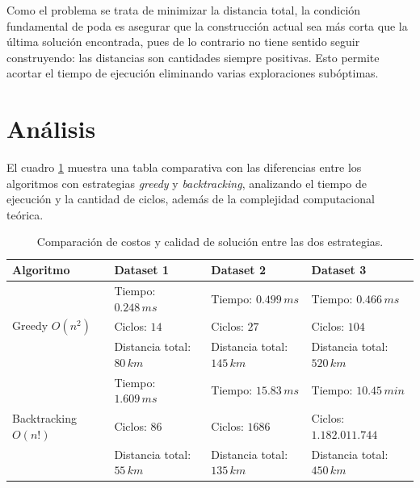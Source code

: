 \documentclass[10 pt, A4paper]{article}
\begin{document}
	Como el problema se trata de minimizar la distancia total, la condición fundamental de poda es asegurar que la construcción actual sea más corta que la última solución encontrada, pues de lo contrario no tiene sentido seguir construyendo: las distancias son cantidades siempre positivas. Esto permite acortar el tiempo de ejecución eliminando varias exploraciones subóptimas.
	
	\section*{Análisis}
	El cuadro \ref{table} muestra una tabla comparativa con las diferencias entre los algoritmos con estrategias \textit{greedy} y \textit{backtracking}, analizando el tiempo de ejecución y la cantidad de ciclos, además de la complejidad computacional teórica.
	
	\begin{table}[h!]
		\centering
		\begin{tabular}{|p{3.8cm} | p{3.5cm} | p{3.6cm} | p{3.6cm}|}
			\hline
			Algoritmo & Dataset 1 & Dataset 2 & Dataset 3 \\
			\hline
			\multirow{3}{1em}{Greedy $O(n^2)$} & Tiempo: $0.248\,ms$ & Tiempo: $0.499\,ms$& Tiempo: $0.466\,ms$ \\ & Ciclos: $14$ & Ciclos: $27$ & Ciclos: $104$ \\ & Distancia total: $80\,km$ & Distancia total: $145\,km$& Distancia total: $520\,km$ \\
			\hline
			\multirow{3}{1em}{Backtracking $O(n!)$} & Tiempo: $1.609\,ms$& Tiempo: $15.83\,ms$& Tiempo: $10.45\,min$\\ & Ciclos: $86$ & Ciclos: $1686$ & Ciclos: $1.182.011.744$ \\ & Distancia total: $55\,km$& Distancia total: $135\,km$& Distancia total: $450\,km$\\
			\hline
		\end{tabular}
		\caption{Comparación de costos y calidad de solución entre las dos estrategias.}
		\label{table}
	\end{table}
	
\end{document}
